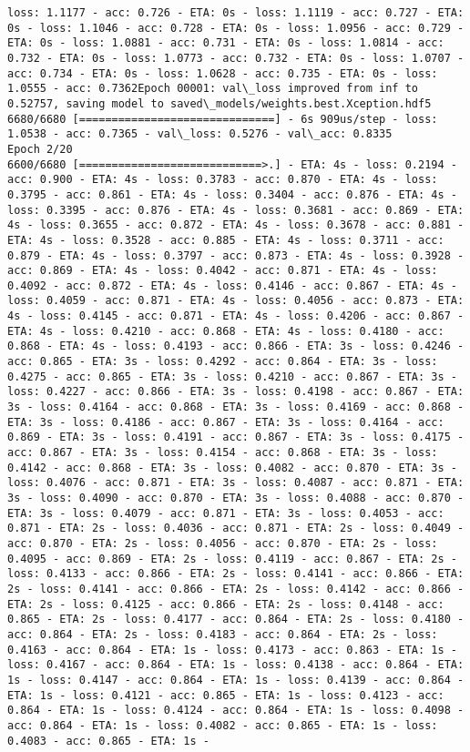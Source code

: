 \documentclass[11pt]{article}
\begin{document}
\begin{Verbatim}[commandchars=\\\{\}]
loss: 1.1177 - acc: 0.726 - ETA: 0s - loss: 1.1119 - acc: 0.727 - ETA: 0s - loss: 1.1046 - acc: 0.728 - ETA: 0s - loss: 1.0956 - acc: 0.729 - ETA: 0s - loss: 1.0881 - acc: 0.731 - ETA: 0s - loss: 1.0814 - acc: 0.732 - ETA: 0s - loss: 1.0773 - acc: 0.732 - ETA: 0s - loss: 1.0707 - acc: 0.734 - ETA: 0s - loss: 1.0628 - acc: 0.735 - ETA: 0s - loss: 1.0555 - acc: 0.7362Epoch 00001: val\_loss improved from inf to 0.52757, saving model to saved\_models/weights.best.Xception.hdf5
6680/6680 [==============================] - 6s 909us/step - loss: 1.0538 - acc: 0.7365 - val\_loss: 0.5276 - val\_acc: 0.8335
Epoch 2/20
6600/6680 [============================>.] - ETA: 4s - loss: 0.2194 - acc: 0.900 - ETA: 4s - loss: 0.3783 - acc: 0.870 - ETA: 4s - loss: 0.3795 - acc: 0.861 - ETA: 4s - loss: 0.3404 - acc: 0.876 - ETA: 4s - loss: 0.3395 - acc: 0.876 - ETA: 4s - loss: 0.3681 - acc: 0.869 - ETA: 4s - loss: 0.3655 - acc: 0.872 - ETA: 4s - loss: 0.3678 - acc: 0.881 - ETA: 4s - loss: 0.3528 - acc: 0.885 - ETA: 4s - loss: 0.3711 - acc: 0.879 - ETA: 4s - loss: 0.3797 - acc: 0.873 - ETA: 4s - loss: 0.3928 - acc: 0.869 - ETA: 4s - loss: 0.4042 - acc: 0.871 - ETA: 4s - loss: 0.4092 - acc: 0.872 - ETA: 4s - loss: 0.4146 - acc: 0.867 - ETA: 4s - loss: 0.4059 - acc: 0.871 - ETA: 4s - loss: 0.4056 - acc: 0.873 - ETA: 4s - loss: 0.4145 - acc: 0.871 - ETA: 4s - loss: 0.4206 - acc: 0.867 - ETA: 4s - loss: 0.4210 - acc: 0.868 - ETA: 4s - loss: 0.4180 - acc: 0.868 - ETA: 4s - loss: 0.4193 - acc: 0.866 - ETA: 3s - loss: 0.4246 - acc: 0.865 - ETA: 3s - loss: 0.4292 - acc: 0.864 - ETA: 3s - loss: 0.4275 - acc: 0.865 - ETA: 3s - loss: 0.4210 - acc: 0.867 - ETA: 3s - loss: 0.4227 - acc: 0.866 - ETA: 3s - loss: 0.4198 - acc: 0.867 - ETA: 3s - loss: 0.4164 - acc: 0.868 - ETA: 3s - loss: 0.4169 - acc: 0.868 - ETA: 3s - loss: 0.4186 - acc: 0.867 - ETA: 3s - loss: 0.4164 - acc: 0.869 - ETA: 3s - loss: 0.4191 - acc: 0.867 - ETA: 3s - loss: 0.4175 - acc: 0.867 - ETA: 3s - loss: 0.4154 - acc: 0.868 - ETA: 3s - loss: 0.4142 - acc: 0.868 - ETA: 3s - loss: 0.4082 - acc: 0.870 - ETA: 3s - loss: 0.4076 - acc: 0.871 - ETA: 3s - loss: 0.4087 - acc: 0.871 - ETA: 3s - loss: 0.4090 - acc: 0.870 - ETA: 3s - loss: 0.4088 - acc: 0.870 - ETA: 3s - loss: 0.4079 - acc: 0.871 - ETA: 3s - loss: 0.4053 - acc: 0.871 - ETA: 2s - loss: 0.4036 - acc: 0.871 - ETA: 2s - loss: 0.4049 - acc: 0.870 - ETA: 2s - loss: 0.4056 - acc: 0.870 - ETA: 2s - loss: 0.4095 - acc: 0.869 - ETA: 2s - loss: 0.4119 - acc: 0.867 - ETA: 2s - loss: 0.4133 - acc: 0.866 - ETA: 2s - loss: 0.4141 - acc: 0.866 - ETA: 2s - loss: 0.4141 - acc: 0.866 - ETA: 2s - loss: 0.4142 - acc: 0.866 - ETA: 2s - loss: 0.4125 - acc: 0.866 - ETA: 2s - loss: 0.4148 - acc: 0.865 - ETA: 2s - loss: 0.4177 - acc: 0.864 - ETA: 2s - loss: 0.4180 - acc: 0.864 - ETA: 2s - loss: 0.4183 - acc: 0.864 - ETA: 2s - loss: 0.4163 - acc: 0.864 - ETA: 1s - loss: 0.4173 - acc: 0.863 - ETA: 1s - loss: 0.4167 - acc: 0.864 - ETA: 1s - loss: 0.4138 - acc: 0.864 - ETA: 1s - loss: 0.4147 - acc: 0.864 - ETA: 1s - loss: 0.4139 - acc: 0.864 - ETA: 1s - loss: 0.4121 - acc: 0.865 - ETA: 1s - loss: 0.4123 - acc: 0.864 - ETA: 1s - loss: 0.4124 - acc: 0.864 - ETA: 1s - loss: 0.4098 - acc: 0.864 - ETA: 1s - loss: 0.4082 - acc: 0.865 - ETA: 1s - loss: 0.4083 - acc: 0.865 - ETA: 1s - 
\end{Verbatim}
\end{document}
